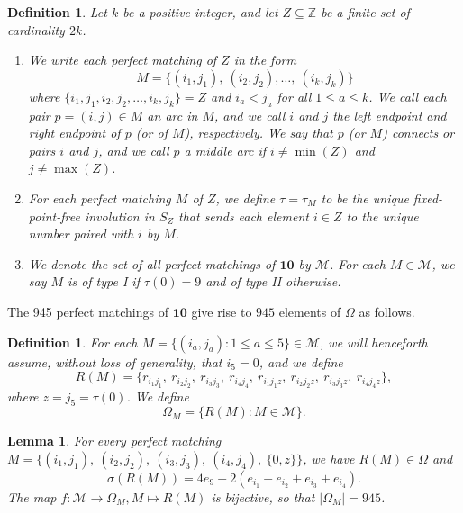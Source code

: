 \documentclass[10pt,a4paper]{amsart}
\newtheorem{lemma}[theorem]{Lemma}
\newtheorem{defn}[theorem]{Definition}
\numberwithin{equation}{section}
\newcommand{\Z}{{\mathbb Z}}
\newcommand{\ra}{\rightarrow}
\newcommand{\calm}{\mathcal{M}}
\newcommand{\rr}{r}
\newcommand{\ten}{\mathbf{10}}
\newcommand{\ob}{\Omega}
\newcommand{\mob}{\Omega_M}
\newcommand{\se}{\subseteq}
\newcommand{\abs}[1]{\lvert #1 \rvert}
\begin{document}
\begin{defn}
\label{defn:mdef}
Let $k$ be a positive integer, and let $Z\se \Z$ be a finite set of cardinality $2k$.
\begin{enumerate}
  \item We write each {perfect matching} of $Z$ in the form 
    \begin{equation}
\label{eq:matching}
M = \{(i_1, j_1), \ (i_2, j_2), \dots, \ (i_k, j_k)\}
\end{equation}
where $\{i_1,j_1,i_2,j_2,\dots, i_k,j_k\}=Z$ and $i_a<j_a$ for all $1\le
a\le k$. We call each pair $p=(i,j)\in M$ an \emph{arc} in $M$, and we call $i$
and $j$ the \emph{left endpoint} and \emph{right endpoint} of $p$ (or of $M$),
respectively. We say that $p$ (or $M$) \emph{connects} or \emph{pairs} $i$ and
$j$, and we call $p$ a \emph{middle arc} if $i\neq \min(Z)$ and $j\neq \max(Z)$. 

\item For each perfect matching $M$ of $Z$, we define $\tau=\tau_M$ to be the unique
  fixed-point-free involution in $S_Z$ that sends each element $i\in Z$ to
  the unique number paired with $i$ by $M$. 

\item We denote the set of all perfect matchings of $\ten$ by $\calm$. For each
$M\in \calm$, we say $M$ is of \emph{type I} if $\tau(0)=9$ and of \emph{type II}
otherwise. 
\end{enumerate} 
\end{defn}

The 945 perfect matchings of $\ten$ give rise to $945$ elements of $\ob$ as
follows.  


\begin{defn}
\label{defn:mob_construction}
For each $M=\{(i_a,j_a):1\le a\le 5\}\in \calm$, we will henceforth
  assume, without loss of generality, that $i_5=0$, and we define  \[ R(M) =
    \{\rr_{i_1 j_1}, \ \rr_{i_2 j_2}, \ \rr_{i_3 j_3}, \ \rr_{i_4 j_4}, \
      \rr_{i_1 j_1z}, \ \rr_{i_2 j_2z}, \ \rr_{i_3 j_3z}, \ \rr_{i_4 j_4z}\}, \]
    where $z=j_5=\tau(0)$. We define \[ \mob=\{R(M):M\in \calm\}. \]
\end{defn}


\begin{lemma}
\label{lemm:mob_sum}
For every perfect matching $M=\{(i_1, j_1), \ (i_2, j_2), \ (i_3, j_3), \ (i_4,
j_4), \ \{0, z\}\}$, we have $R(M)\in\ob$ and 
\begin{equation}
  \label{eq:mob_sum}
  \sigma(R(M)) = 4e_9 + 2(e_{i_1} + e_{i_2} + e_{i_3} + e_{i_4}).
\end{equation}
The map $f: \calm\ra \mob, M\mapsto R(M)$ is bijective, so that
$\abs{\mob}=945$.
\end{lemma}
\end{document}
